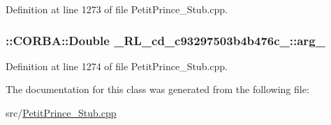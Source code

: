 Definition at line 1273 of file Petit\+Prince\+\_\+\+Stub.\+cpp.

\subsubsection[{\texorpdfstring{arg\+\_\+2}{arg_2}}]{\setlength{\rightskip}{0pt plus 5cm}\+::C\+O\+R\+B\+A\+::\+Double \+\_\+R\+L\+\_\+cd\+\_\+c93297503b4b476c\+\_\+::arg\+\_}\hypertarget{class__0_r_l__cd__c93297503b4b476c__50000000_a6db84fccb3f773ae9dcf309b0b7e3682}{}\label{class__0_r_l__cd__c93297503b4b476c__50000000_a6db84fccb3f773ae9dcf309b0b7e3682}


Definition at line 1274 of file Petit\+Prince\+\_\+\+Stub.\+cpp.



The documentation for this class was generated from the following file\+:\begin{DoxyCompactItemize}
\item 
src/\hyperlink{_petit_prince___stub_8cpp}{Petit\+Prince\+\_\+\+Stub.\+cpp}\end{DoxyCompactItemize}
